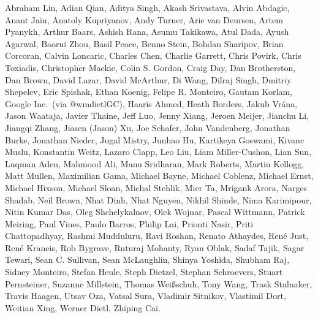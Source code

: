 Abraham Lin,
Adian Qian,
Aditya Singh,
Akash Srivastava,
Alvin Abdagic,
Anant Jain,
Anatoly Kupriyanov,
Andy Turner,
Arie van Deursen,
Artem Pyanykh,
Arthur Baars,
Ashish Rana,
Asumu Takikawa,
Atul Dada,
Ayush Agarwal,
Baorui Zhou,
Basil Peace,
Benno Stein,
Bohdan Sharipov,
Brian Corcoran,
Calvin Loncaric,
Charles Chen,
Charlie Garrett,
Chris Povirk,
Chris Toxiadis,
Christopher Mackie,
Colin S. Gordon,
Craig Day,
Dan Brotherston,
Dan Brown,
David Lazar,
David McArthur,
Di Wang,
Dilraj Singh,
Dmitriy Shepelev,
Eric Spishak,
Ethan Koenig,
Felipe R. Monteiro,
Gautam Korlam,
Google Inc.\ (via @wmdietlGC),
Haaris Ahmed,
Heath Borders,
Jakub Vr\'ana,
Jason Waataja,
Javier Thaine,
Jeff Luo,
Jenny Xiang,
Jeroen Meijer,
Jianchu Li,
Jiangqi Zhang,
Jiasen (Jason) Xu,
Joe Schafer,
John Vandenberg,
Jonathan Burke,
Jonathan Nieder,
Jugal Mistry,
Junhao Hu,
Kartikeya Goswami,
Kivanc Muslu,
Konstantin Weitz,
Lazaro Clapp,
Leo Liu,
Liam Miller-Cushon,
Lian Sun,
Luqman Aden,
Mahmood Ali,
Manu Sridharan,
Mark Roberts,
Martin Kellogg,
Matt Mullen,
Maximilian Gama,
Michael Bayne,
Michael Coblenz,
Michael Ernst,
Michael Hixson,
Michael Sloan,
Michal Stehlik,
Mier Ta,
Mrigank Arora,
Narges Shadab,
Neil Brown,
Nhat Dinh,
Nhat Nguyen,
Nikhil Shinde,
Nima Karimipour,
Nitin Kumar Das,
Oleg Shchelykalnov,
Olek Wojnar,
Pascal Wittmann,
Patrick Meiring,
Paul Vines,
Paulo Barros,
Philip Lai,
Prionti Nasir,
Priti Chattopadhyay,
Rashmi Mudduluru,
Ravi Roshan,
Renato Athaydes,
Ren\'e Just,
Ren\'e Kraneis,
Rob Bygrave,
Ruturaj Mohanty,
Ryan Oblak,
Sadaf Tajik,
Sagar Tewari,
Sean C. Sullivan,
Sean McLaughlin,
Shinya Yoshida,
Shubham Raj,
Sidney Monteiro,
Stefan Heule,
Steph Dietzel,
Stephan Schroevers,
Stuart Pernsteiner,
Suzanne Millstein,
Thomas Wei\ss schuh,
Tony Wang,
Trask Stalnaker,
Travis Haagen,
Utsav Oza,
Vatsal Sura,
Vladimir Sitnikov,
Vlastimil Dort,
Weitian Xing,
Werner Dietl,
Zhiping Cai.
